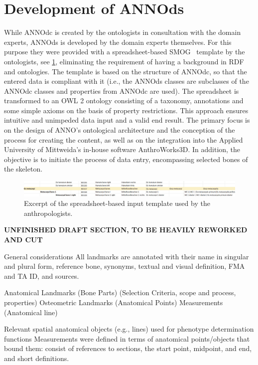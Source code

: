 \documentclass[sw]{iosart2x}
\begin{document}
\section{Development of ANNOds}\label{sec:domain}
While ANNOdc is created by the ontologists in consultation with the domain experts, ANNOds is developed by the domain experts themselves.
For this purpose they were provided with a spreadsheet-based SMOG~\citep{smog} template by the ontologists, see \cref{fig:smog}, eliminating the requirement of having a background in RDF and ontologies.
The template is based on the structure of ANNOdc, so that the entered data is compliant with it (i.e., the ANNOds classes are subclasses of the ANNOdc classes and properties from ANNOdc are used).
The spreadsheet is transformed to an OWL 2 ontology consisting of a taxonomy, annotations and some simple axioms on the basis of property restrictions.
This approach ensures intuitive and unimpeded data input and a valid end result.
The primary focus is on the design of ANNO’s ontological architecture and the conception of the process for creating the content, as well as on the integration into the Applied University of Mittweida’s in-house software AnthroWorks3D.
In addition, the objective is to initiate the process of data entry, encompassing selected bones of the skeleton.

\begin{figure}[h!t]
\includegraphics[width=\textwidth]{img/smog.png}
\caption{Excerpt of the spreadsheet-based input template used by the anthropologists.}\label{fig:smog}
\end{figure}

\textbf{UNFINISHED DRAFT SECTION, TO BE HEAVILY REWORKED AND CUT}

General considerations 
All landmarks are annotated with their name in singular and plural form, reference bone, synonyms, textual and visual definition, FMA and TA ID, and sources.

Anatomical Landmarks (Bone Parts)  (Selection Criteria, scope and process,  properties) 
Osteometric Landmarks (Anatomical Points) 
Measurements (Anatomical line)  


Relevant spatial anatomical objects (e.g., lines) used for phenotype determination functions Measurements were defined in terms of anatomical points/objects that bound them: consist of references to sections, the start point, midpoint, and end, and short definitions.
\end{document}
